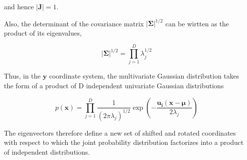 and hence $|\mathbf{J}| = 1$.

Also, the determinant of the covariance matrix $|\bm{\Sigma}|^{1/2}$ can be wirtten as the product of its eigenvalues,

\begin{equation}
 |\bm{\Sigma}|^{1/2} = \prod_{j=1}^D \lambda_j^{1/2}
\end{equation}

Thus, in the $\mathbf{y}$ coordinate system, the multivariate Gaussian distribution takes the form of a product of D independent univariate Gaussian distributions

\begin{equation}
p(\mathbf{x}) = \prod_{j=1}^D \frac{1}{(2 \pi \lambda_j)^{1/2}} \exp \left( - \frac{\mathbf{u_i}(\mathbf{x}-\bm{\mu}) }{2 \lambda_j } \right)
\end{equation}

The eigenvectors therefore define a new set of shifted and rotated coordinates with respect to which the joint probability distribution factorizes into a product of independent distributions.





